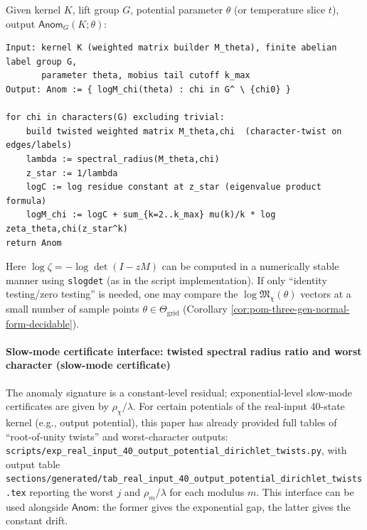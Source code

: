 \begin{remark}\label{rem:pom-anom-pseudocode}
Given kernel \(K\), lift group \(G\), potential parameter \(\theta\) (or temperature slice \(t\)), output \(\mathsf{Anom}_G(K;\theta)\):
\begin{verbatim}
Input: kernel K (weighted matrix builder M_theta), finite abelian label group G,
       parameter theta, mobius tail cutoff k_max
Output: Anom := { logM_chi(theta) : chi in G^ \ {chi0} }

for chi in characters(G) excluding trivial:
    build twisted weighted matrix M_theta,chi  (character-twist on edges/labels)
    lambda := spectral_radius(M_theta,chi)
    z_star := 1/lambda
    logC := log residue constant at z_star (eigenvalue product formula)
    logM_chi := logC + sum_{k=2..k_max} mu(k)/k * log zeta_theta,chi(z_star^k)
return Anom
\end{verbatim}
Here \(\log\zeta=-\log\det(I-zM)\) can be computed in a numerically stable manner using \texttt{slogdet} (as in the script implementation).
If only ``identity testing/zero testing'' is needed, one may compare the \(\log\mathfrak{M}_\chi(\theta)\) vectors at a small number of sample points \(\theta\in\Theta_{\mathrm{grid}}\) (Corollary \ref{cor:pom-three-gen-normal-form-decidable}).
\end{remark}

\paragraph{Slow-mode certificate interface: twisted spectral radius ratio and worst character (slow-mode certificate)}
The anomaly signature is a constant-level residual; exponential-level slow-mode certificates are given by \(\rho_\chi/\lambda\).
For certain potentials of the real-input 40-state kernel (e.g., output potential), this paper has already provided full tables of ``root-of-unity twists'' and worst-character outputs:
\texttt{scripts/exp\_real\_input\_40\_output\_potential\_dirichlet\_twists.py},
with output table \texttt{sections/generated/tab\_real\_input\_40\_output\_potential\_dirichlet\_twists.tex}
reporting the worst \(j\) and \(\rho_m/\lambda\) for each modulus \(m\).
This interface can be used alongside \(\mathsf{Anom}\): the former gives the exponential gap, the latter gives the constant drift.

